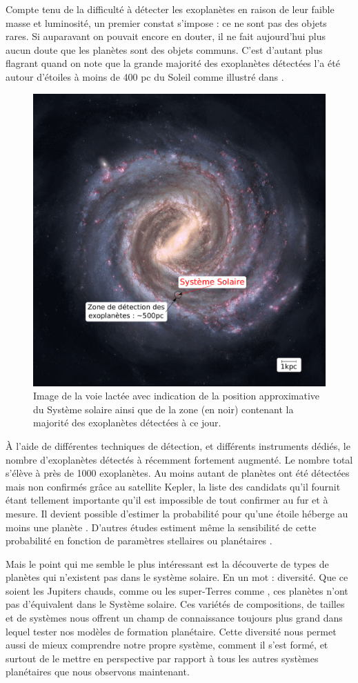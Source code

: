 Compte tenu de la difficulté à détecter les exoplanètes en raison de leur faible masse et luminosité, un premier constat
s'impose : ce ne sont pas des objets rares. Si auparavant on pouvait encore en douter, il ne fait aujourd'hui plus aucun doute
que les planètes sont des objets communs. C'est d'autant plus flagrant quand on note que la grande majorité des exoplanètes
détectées l'a été autour d'étoiles à moins de 400 pc du Soleil comme illustré dans . 

\begin{figure}[htbp]
\centering
\includegraphics[width=0.45\linewidth]{figure/milky_way_exoplanets.pdf}
\caption[Sphère de détection des exoplanètes par rapport à la Voie Lactée]{Image de la voie lactée avec indication de la
position approximative du Système solaire ainsi que de la zone (en noir) contenant la majorité des exoplanètes détectées à ce
jour.}\label{fig:milky_way_exoplanet}
\end{figure}

À l'aide de différentes techniques de détection, et différents instruments dédiés, le nombre d'exoplanètes détectés à récemment fortement augmenté. Le nombre total s'élève à près de 1000 exoplanètes. Au moins autant de planètes ont été détectées mais non confirmés grâce au satellite Kepler, la liste des candidats qu'il fournit étant tellement importante qu'il est impossible de tout confirmer au fur et à mesure. Il devient
possible d'estimer la probabilité pour qu'une étoile héberge au moins une planète \citep{mayor2011road}. D'autres études
estiment même la sensibilité de cette probabilité en fonction de paramètres stellaires \citep{fischer2005planet,
johnson2007new, howard2012occurrence} ou planétaires \citep{mayor2011road, howard2010occurrence}. 

Mais le point qui me semble le plus intéressant est la découverte de types de planètes qui n'existent pas dans le système
solaire. En un mot : diversité. Que ce soient les Jupiters chauds, comme  ou les super-Terres comme
, ces planètes n'ont pas d'équivalent dans le Système solaire. Ces variétés de compositions, de tailles et de
systèmes nous offrent un champ de connaissance toujours plus grand dans lequel tester nos modèles de formation planétaire.
Cette diversité nous permet aussi de mieux comprendre notre propre système, comment il s'est formé, et surtout de le mettre
en perspective par rapport à tous les autres systèmes planétaires que nous observons maintenant.

